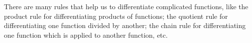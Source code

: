 There are many rules that help us to differentiate complicated functions, like the product rule
for differentiating products of functions; the quotient rule for differentiating 
one function divided by another; the chain rule for differentiating one function
which is applied to another function, etc.